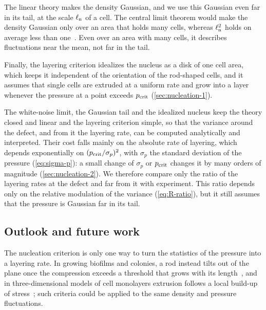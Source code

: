 \documentclass[aps,pre,reprint,superscriptaddress,longbibliography,nofootinbib
]{revtex4-2}
\begin{document}
The linear theory makes the density Gaussian, and we use
this Gaussian even far in its tail, at the scale $\ell_{\rm n}$ of
a cell. The central limit theorem would make the density
Gaussian only over an area that holds many cells, whereas
$\ell_{\rm n}^2$ holds on average less than
one~\cite{velenich2008brownian}. Even over an area with
many cells, it describes fluctuations near the mean, not
far in the tail.

Finally, the layering criterion idealizes the nucleus as a
disk of one cell area, which keeps it independent of the
orientation of the rod-shaped cells, and it assumes that
single cells are extruded at a uniform rate and grow into a
layer whenever the pressure at a point exceeds $p_{\rm crit}$
(\cref{sec:nucleation-1}).

The white-noise limit, the Gaussian tail and the idealized
nucleus keep the theory closed and linear and the layering
criterion simple, so that the variance around the defect,
and from it the layering rate, can be computed analytically
and interpreted. Their cost falls mainly on the absolute
rate of layering, which depends exponentially on
$(p_{\rm crit}/\sigma_p)^2$, with $\sigma_p$ the standard
deviation of the pressure (\cref{eq:sigma-p}): a small
change of $\sigma_p$ or $p_{\rm crit}$ changes it by many orders
of magnitude (\cref{sec:nucleation-2}). We therefore
compare only the ratio of the layering rates at the defect
and far from it with experiment. This ratio depends only on
the relative modulation of the variance
(\cref{eq:R-ratio}), but it still assumes that the pressure
is Gaussian far in its tail.

\subsection{Outlook and future work}
\label{sec:overlook-and-future-work}

The nucleation criterion is only one way to turn the
statistics of the pressure into a layering rate. In growing
biofilms and colonies, a rod instead tilts out of the plane
once the compression exceeds a threshold that grows with
its length~\cite{beroz2018verticalization,you2019mono}, and
in three-dimensional models of cell monolayers extrusion
follows a local build-up of
stress~\cite{monfared2023mechanical}; such criteria could
be applied to the same density and pressure fluctuations.
\end{document}
